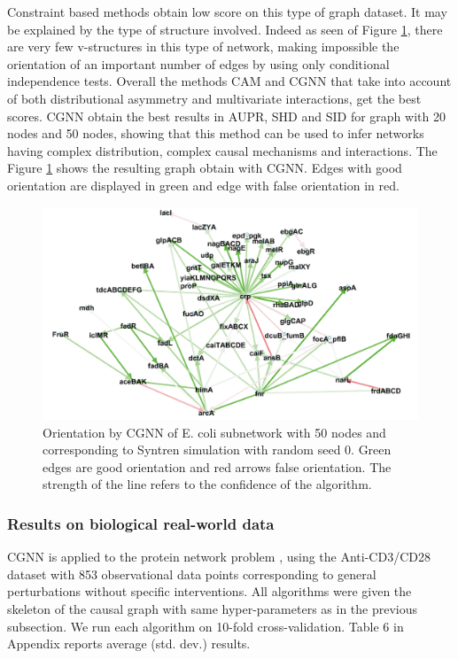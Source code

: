 \documentclass[a4paper, 11pt]{article}
\begin{document}
 Constraint based methods obtain low score on this type of graph dataset. It may be explained by the type of structure involved. Indeed as seen of Figure \ref{fig:graph_syntren_cgnn}, there are very few v-structures in this type of network, making impossible the orientation of an important number of edges by using only conditional independence tests. Overall the methods CAM and CGNN that take into account of both distributional asymmetry and multivariate interactions, get the best scores. CGNN obtain the best results in AUPR, SHD and SID for graph with 20 nodes and 50 nodes, showing that this method can be used to infer networks having complex distribution, complex causal mechanisms and interactions. The Figure \ref{fig:graph_syntren_cgnn} shows the resulting graph obtain with CGNN. Edges with good orientation are displayed in green and edge with false orientation in red.

\begin{figure}[h!]
\centering
\includegraphics[width=\textwidth]{graph_syntren_cgnn.png}
\caption{Orientation by CGNN of E. coli subnetwork with 50 nodes and corresponding to  Syntren simulation with random seed 0. Green edges are good orientation and red arrows false orientation. The strength of the line refers to the confidence of the algorithm.}
\label{fig:graph_syntren_cgnn}
\end{figure}


\subsubsection{Results on biological real-world data}

CGNN is applied to the protein network problem \cite{sachs2005causal}, using the Anti-CD3/CD28 dataset with  853 observational data points corresponding to general perturbations without specific interventions. All algorithms were given the skeleton of the causal graph \cite[Fig. 2]{sachs2005causal} with same hyper-parameters as in the previous subsection. We run each algorithm on 10-fold cross-validation. Table 6 in Appendix reports average (std. dev.) results.
\end{document}
